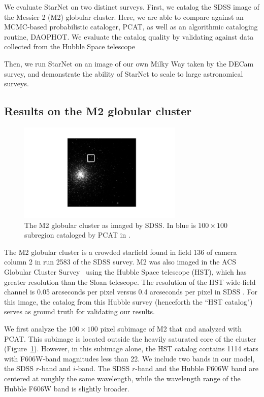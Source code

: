 We evaluate StarNet on two distinct surveys. First, we catalog the SDSS image of the Messier 2 (M2) globular cluster. 
Here, we are able to compare against an MCMC-based probabilistic cataloger, PCAT, as well as an algorithmic cataloging routine, DAOPHOT.
We evaluate the catalog quality by validating against data collected from 
the Hubble Space telescope

Then, we run StarNet on an image of our own Milky Way taken by the DECam survey,
and demonstrate the ability of StarNet to scale to large astronomical surveys.

\subsection{Results on the M2 globular cluster}
\label{sec:results_on_m2}

\begin{figure}[tb]
    \centering
    \includegraphics[width=0.7\textwidth]{figures/m2_results/m2_regions.png}
    \vspace{-1cm}
    \caption{The M2 globular cluster as imaged by SDSS. In blue is $100 \times 100$ subregion 
    cataloged by PCAT in \cite{Feder_2019}. }
    \label{fig:m2_region}
\end{figure}

The M2 globular cluster is a crowded starfield found in field 136 of camera column 2 in run 2583 of the SDSS survey. 
M2 was also imaged in the ACS Globular Cluster Survey~\citep{Sarajedini_2007}
using the Hubble Space telescope (HST),
which has greater resolution than the Sloan telescope.
The resolution of the HST wide-field channel is 0.05 arcseconds per pixel versus
0.4 arcseconds per pixel in SDSS \citep{hubble_about, sdss_about}.
For this image, the catalog from this Hubble survey (henceforth the ``HST catalog")
serves as ground truth for validating our results.

We first analyze the $100 \times 100$ pixel subimage of M2 that
\cite{Portillo_2017} and \cite{Feder_2019} analyzed with PCAT.
This subimage is located outside the heavily saturated core of the cluster (Figure~\ref{fig:m2_region}). 
However, in this subimage alone, the HST catalog contains 1114 stars with F606W-band magnitudes less than 22.
We include two bands in our model, the SDSS $r$-band and $i$-band.
The SDSS $r$-band and the Hubble F606W band are centered at roughly the same wavelength,
while the wavelength range of the Hubble F606W band is slightly broader.

